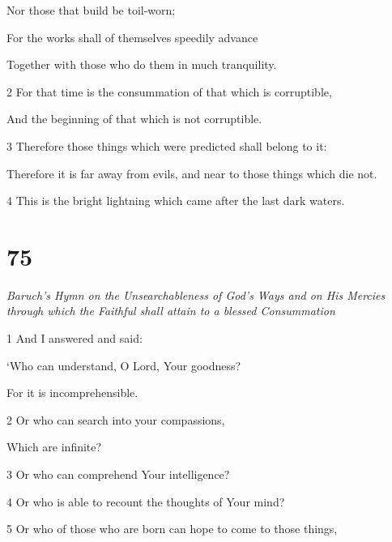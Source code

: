 \par Nor those that build be toil-worn;

\par For the works shall of themselves speedily advance

\par Together with those who do them in much tranquility.

\par 2 For that time is the consummation of that which is corruptible,

\par And the beginning of that which is not corruptible.

\par 3 Therefore those things which were predicted shall belong to it:

\par Therefore it is far away from evils, and near to those things which die not.

\par 4 This is the bright lightning which came after the last dark waters.

\chapter{75}

\par \textit{Baruch's Hymn on the Unsearchableness of God's Ways and on His Mercies through which the Faithful shall attain to a blessed Consummation}

\par 1 And I answered and said:

\par ‘Who can understand, O Lord, Your goodness?

\par For it is incomprehensible.

\par 2 Or who can search into your compassions,

\par Which are infinite?

\par 3 Or who can comprehend Your intelligence?

\par 4 Or who is able to recount the thoughts of Your mind?

\par 5 Or who of those who are born can hope to come to those things,

